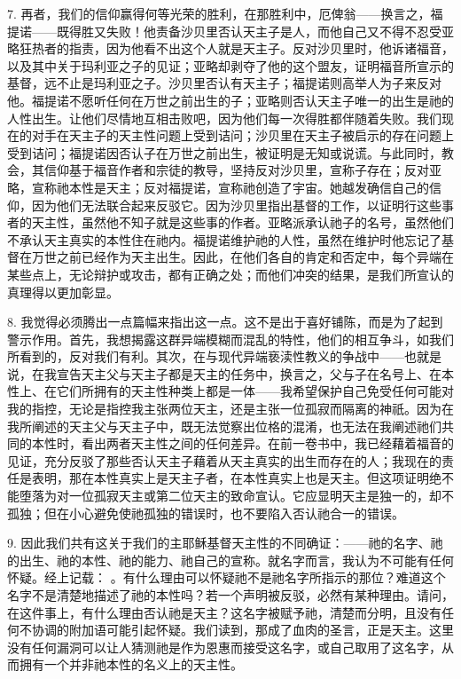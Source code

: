 7. 再者，我们的信仰赢得何等光荣的胜利，在那胜利中，厄俾翁——换言之，福提诺——既得胜又失败！他责备沙贝里否认天主子是人，而他自己又不得不忍受亚略狂热者的指责，因为他看不出这个人就是天主子。反对沙贝里时，他诉诸福音，以及其中关于玛利亚之子的见证；亚略却剥夺了他的这个盟友，证明福音所宣示的基督，远不止是玛利亚之子。沙贝里否认有天主子；福提诺则高举人为子来反对他。福提诺不愿听任何在万世之前出生的子；亚略则否认天主子唯一的出生是祂的人性出生。让他们尽情地互相击败吧，因为他们每一次得胜都伴随着失败。我们现在的对手在天主子的天主性问题上受到诘问；沙贝里在天主子被启示的存在问题上受到诘问；福提诺因否认子在万世之前出生，被证明是无知或说谎。与此同时，教会，其信仰基于福音作者和宗徒的教导，坚持反对沙贝里，宣称子存在；反对亚略，宣称祂本性是天主；反对福提诺，宣称祂创造了宇宙。她越发确信自己的信仰，因为他们无法联合起来反驳它。因为沙贝里指出基督的工作，以证明行这些事者的天主性，虽然他不知子就是这些事的作者。亚略派承认祂子的名号，虽然他们不承认天主真实的本性住在祂内。福提诺维护祂的人性，虽然在维护时他忘记了基督在万世之前已经作为天主出生。因此，在他们各自的肯定和否定中，每个异端在某些点上，无论辩护或攻击，都有正确之处；而他们冲突的结果，是我们所宣认的真理得以更加彰显。\par

8. 我觉得必须腾出一点篇幅来指出这一点。这不是出于喜好铺陈，而是为了起到警示作用。首先，我想揭露这群异端模糊而混乱的特性，他们的相互争斗，如我们所看到的，反对我们有利。其次，在与现代异端亵渎性教义的争战中——也就是说，在我宣告天主父与天主子都是天主的任务中，换言之，父与子在名号上、在本性上、在它们所拥有的天主性种类上都是一体——我希望保护自己免受任何可能对我的指控，无论是指控我主张两位天主，还是主张一位孤寂而隔离的神祇。因为在我所阐述的天主父与天主子中，既无法觉察出位格的混淆，也无法在我阐述祂们共同的本性时，看出两者天主性之间的任何差异。在前一卷书中，我已经藉着福音的见证，充分反驳了那些否认天主子藉着从天主真实的出生而存在的人；我现在的责任是表明，那在本性真实上是天主子者，在本性真实上也是天主。但这项证明绝不能堕落为对一位孤寂天主或第二位天主的致命宣认。它应显明天主是独一的，却不孤独；但在小心避免使祂孤独的错误时，也不要陷入否认祂合一的错误。\par

9. 因此我们共有这关于我们的主耶稣基督天主性的不同确证：——祂的名字、祂的出生、祂的本性、祂的能力、祂自己的宣称。就名字而言，我认为不可能有任何怀疑。经上记载： 。有什么理由可以怀疑祂不是祂名字所指示的那位？难道这个名字不是清楚地描述了祂的本性吗？若一个声明被反驳，必然有某种理由。请问，在这件事上，有什么理由否认祂是天主？这名字被赋予祂，清楚而分明，且没有任何不协调的附加语可能引起怀疑。我们读到，那成了血肉的圣言，正是天主。这里没有任何漏洞可以让人猜测祂是作为恩惠而接受这名字，或自己取用了这名字，从而拥有一个并非祂本性的名义上的天主性。\par

